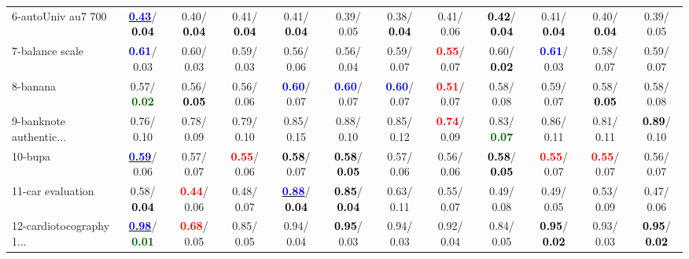 \begin{table}[h]
\begin{center}
{\begin{tabular}{lc|c|c|c|c|c|c|c|c|c|c}
6-autoUniv au7 700 & \underline{\textcolor{blue}{\textbf{  0.43}}}/\textcolor{black}{\textbf{  0.04}} &   0.40/\textcolor{black}{\textbf{  0.04}} &   0.41/\textcolor{black}{\textbf{  0.04}} &   0.41/\textcolor{black}{\textbf{  0.04}} &   0.39/  0.05 &   0.38/\textcolor{black}{\textbf{  0.04}} &   0.41/  0.06 & \textcolor{black}{\textbf{  0.42}}/\textcolor{black}{\textbf{  0.04}} &   0.41/\textcolor{black}{\textbf{  0.04}} &   0.40/\textcolor{black}{\textbf{  0.04}} &   0.39/  0.05 \\
7-balance scale & \textcolor{blue}{\textbf{  0.61}}/  0.03 &   0.60/  0.03 &   0.59/  0.03 &   0.56/  0.06 &   0.56/  0.04 &   0.59/  0.07 & \textcolor{red}{\textbf{  0.55}}/  0.07 &   0.60/\textcolor{black}{\textbf{  0.02}} & \textcolor{blue}{\textbf{  0.61}}/  0.03 &   0.58/  0.07 &   0.59/  0.07 \\ \hline
8-banana &   0.57/\textcolor{darkgreen}{\textbf{  0.02}} &   0.56/\textcolor{black}{\textbf{  0.05}} &   0.56/  0.06 & \textcolor{blue}{\textbf{  0.60}}/  0.07 & \textcolor{blue}{\textbf{  0.60}}/  0.07 & \textcolor{blue}{\textbf{  0.60}}/  0.07 & \textcolor{red}{\textbf{  0.51}}/  0.07 &   0.58/  0.08 &   0.59/  0.07 &   0.58/\textcolor{black}{\textbf{  0.05}} &   0.58/  0.08 \\
9-banknote authentic... &   0.76/  0.10 &   0.78/  0.09 &   0.79/  0.10 &   0.85/  0.15 &   0.88/  0.10 &   0.85/  0.12 & \textcolor{red}{\textbf{  0.74}}/  0.09 &   0.83/\textcolor{darkgreen}{\textbf{  0.07}} &   0.86/  0.11 &   0.81/  0.11 & \textcolor{black}{\textbf{  0.89}}/  0.10 \\
10-bupa & \underline{\textcolor{blue}{\textbf{  0.59}}}/  0.06 &   0.57/  0.07 & \textcolor{red}{\textbf{  0.55}}/  0.06 & \textcolor{black}{\textbf{  0.58}}/  0.07 & \textcolor{black}{\textbf{  0.58}}/\textcolor{black}{\textbf{  0.05}} &   0.57/  0.06 &   0.56/  0.06 & \textcolor{black}{\textbf{  0.58}}/\textcolor{black}{\textbf{  0.05}} & \textcolor{red}{\textbf{  0.55}}/  0.07 & \textcolor{red}{\textbf{  0.55}}/  0.07 &   0.56/  0.07 \\
11-car evaluation &   0.58/\textcolor{black}{\textbf{  0.04}} & \textcolor{red}{\textbf{  0.44}}/  0.06 &   0.48/  0.07 & \underline{\textcolor{blue}{\textbf{  0.88}}}/\textcolor{black}{\textbf{  0.04}} & \textcolor{black}{\textbf{  0.85}}/\textcolor{black}{\textbf{  0.04}} &   0.63/  0.11 &   0.55/  0.07 &   0.49/  0.08 &   0.49/  0.05 &   0.53/  0.09 &   0.47/  0.06 \\
12-cardiotocography 1... & \underline{\textcolor{blue}{\textbf{  0.98}}}/\textcolor{darkgreen}{\textbf{  0.01}} & \textcolor{red}{\textbf{  0.68}}/  0.05 &   0.85/  0.05 &   0.94/  0.04 & \textcolor{black}{\textbf{  0.95}}/  0.03 &   0.94/  0.03 &   0.92/  0.04 &   0.84/  0.05 & \textcolor{black}{\textbf{  0.95}}/\textcolor{black}{\textbf{  0.02}} &   0.93/  0.03 & \textcolor{black}{\textbf{  0.95}}/\textcolor{black}{\textbf{  0.02}} \\

\end{tabular}}
\end{center}
\end{table}
